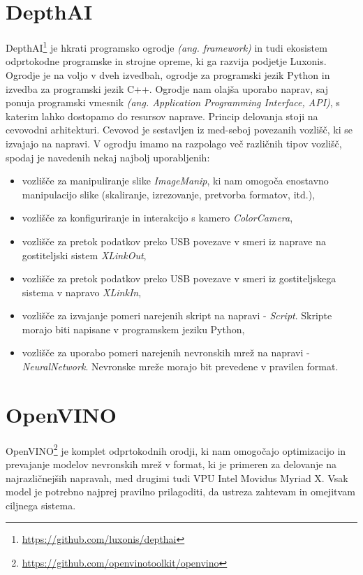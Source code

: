 \documentclass[a4paper,12pt,openright]{book}
\begin{document}
\section{DepthAI}
DepthAI\footnote{\url{https://github.com/luxonis/depthai}} je hkrati programsko ogrodje \emph{(ang. framework)} in tudi ekosistem odprtokodne programske in strojne opreme, ki ga razvija podjetje Luxonis. Ogrodje je na voljo v dveh izvedbah, ogrodje za programski jezik Python in izvedba za programski jezik C++. Ogrodje nam olajša uporabo naprav, saj ponuja programski vmesnik \emph{(ang. Application Programming Interface, API)}, s katerim lahko dostopamo do resursov naprave. Princip delovanja stoji na cevovodni arhitekturi. Cevovod je sestavljen iz med-seboj povezanih vozlišč, ki se izvajajo na napravi. V ogrodju imamo na razpolago več različnih tipov vozlišč, spodaj je navedenih nekaj najbolj uporabljenih:
\begin{itemize}
    \item vozlišče za manipuliranje slike \emph{ImageManip}, ki nam omogoča enostavno manipulacijo slike (skaliranje, izrezovanje, pretvorba formatov, itd.),
    \item vozlišče za konfiguriranje in interakcijo s kamero \emph{ColorCamera},
    \item vozlišče za pretok podatkov preko USB povezave v smeri iz naprave na gostiteljski sistem \emph{XLinkOut},
    \item vozlišče za pretok podatkov preko USB povezave v smeri iz gostiteljskega sistema v napravo \emph{XLinkIn},
    \item vozlišče za izvajanje pomeri narejenih skript na napravi - \emph{Script}. Skri\-pte morajo biti napisane v programskem jeziku Python,
    \item vozlišče za uporabo pomeri narejenih nevronskih mrež na napravi - \emph{NeuralNetwork}. Nevronske mreže morajo bit prevedene v pravilen format.
\end{itemize}

\section{OpenVINO}
OpenVINO\footnote{\url{https://github.com/openvinotoolkit/openvino}} je komplet odprtokodnih orodji, ki nam omogočajo optimizacijo in prevajanje modelov nevronskih mrež v format, ki je primeren za delovanje na najrazličnejših napravah, med drugimi tudi VPU Intel Movidus Myriad X. Vsak model je potrebno najprej pravilno prilagoditi, da ustreza zahtevam in omejitvam ciljnega sistema.
\end{document}
